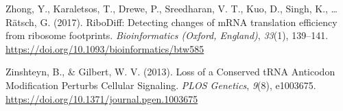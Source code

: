 \documentclass[12pt,openany]{book}
\begin{document}
\hypertarget{ref-Zhong2017}{}
Zhong, Y., Karaletsos, T., Drewe, P., Sreedharan, V. T., Kuo, D., Singh,
K., \ldots{} Rätsch, G. (2017). RiboDiff: Detecting changes of mRNA
translation efficiency from ribosome footprints. \emph{Bioinformatics
(Oxford, England)}, \emph{33}(1), 139--141.
\url{https://doi.org/10.1093/bioinformatics/btw585}

\hypertarget{ref-Zinshteyn2013}{}
Zinshteyn, B., \& Gilbert, W. V. (2013). Loss of a Conserved tRNA
Anticodon Modification Perturbs Cellular Signaling. \emph{PLOS
Genetics}, \emph{9}(8), e1003675.
\url{https://doi.org/10.1371/journal.pgen.1003675}
\end{document}
